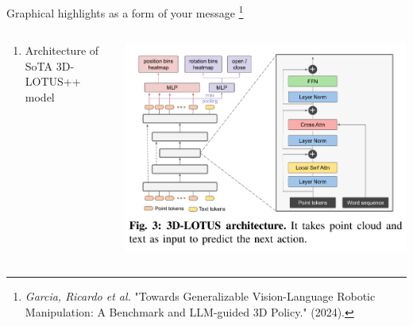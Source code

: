 \documentclass[12pt,pdf,hyperref={unicode}]{beamer}
\begin{document}
\begin{frame}{Graphical highlights  as a form of your message%
\footnote{\textit{Garcia, Ricardo et al.} "Towards Generalizable Vision-Language Robotic Manipulation: A Benchmark and LLM-guided 3D Policy." (2024).}}
\begin{columns}
\begin{column}{0.3\textwidth}
\begin{enumerate}[1)]
    \item Architecture of SoTA 3D-LOTUS++ model 
\end{enumerate}
\end{column}
\begin{column}{0.7\textwidth}
	\includegraphics[width=1\textwidth]{3dlotus_arch.png}
\end{column}
\end{columns}
\end{frame}
\end{document}
